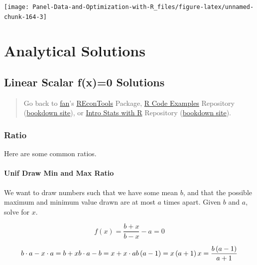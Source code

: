 \documentclass[
]{book}
\begin{document}
\begin{center}\texttt{[image: Panel-Data-and-Optimization-with-R\_files/figure-latex/unnamed-chunk-164-3]} \end{center}

\hypertarget{analytical-solutions}{%
\section{Analytical Solutions}\label{analytical-solutions}}

\hypertarget{linear-scalar-fx0-solutions}{%
\subsection{Linear Scalar f(x)=0 Solutions}\label{linear-scalar-fx0-solutions}}

\begin{quote}
Go back to \href{http://fanwangecon.github.io/}{fan}'s \href{https://fanwangecon.github.io/REconTools/}{REconTools} Package, \href{https://fanwangecon.github.io/R4Econ/}{R Code Examples} Repository (\href{https://fanwangecon.github.io/R4Econ/bookdown}{bookdown site}), or \href{https://fanwangecon.github.io/Stat4Econ/}{Intro Stats with R} Repository (\href{https://fanwangecon.github.io/Stat4Econ/bookdown}{bookdown site}).
\end{quote}

\hypertarget{ratio}{%
\subsubsection{Ratio}\label{ratio}}

Here are some common ratios.

\hypertarget{unif-draw-min-and-max-ratio}{%
\paragraph{Unif Draw Min and Max Ratio}\label{unif-draw-min-and-max-ratio}}

We want to draw numbers such that we have some mean \(b\), and that the possible maximum and minimum value drawn are at most \(a\) times apart. Given \(b\) and \(a\), solve for \(x\).

\[
f(x) = \frac{b+x}{b-x} - a = 0
\]

\[
b \cdot a - x \cdot a = b + x \\
b \cdot a - b = x + x \cdot a  \\
b \left(a - 1\right) = x \left( a+ 1\right)  \\
x = \frac{b\left(a-1\right)}{a+1}\\
\]
\end{document}
